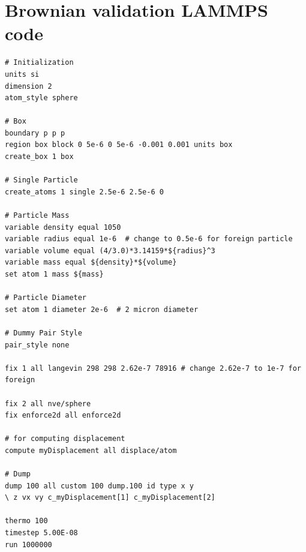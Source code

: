 \section{Brownian validation LAMMPS code}
{\small
\begin{verbatim}
# Initialization
units si
dimension 2
atom_style sphere

# Box
boundary p p p
region box block 0 5e-6 0 5e-6 -0.001 0.001 units box
create_box 1 box

# Single Particle
create_atoms 1 single 2.5e-6 2.5e-6 0

# Particle Mass
variable density equal 1050
variable radius equal 1e-6  # change to 0.5e-6 for foreign particle
variable volume equal (4/3.0)*3.14159*${radius}^3
variable mass equal ${density}*${volume}
set atom 1 mass ${mass}

# Particle Diameter
set atom 1 diameter 2e-6  # 2 micron diameter

# Dummy Pair Style
pair_style none

fix 1 all langevin 298 298 2.62e-7 78916 # change 2.62e-7 to 1e-7 for foreign

fix 2 all nve/sphere
fix enforce2d all enforce2d

# for computing displacement
compute myDisplacement all displace/atom

# Dump
dump 100 all custom 100 dump.100 id type x y 
\ z vx vy c_myDisplacement[1] c_myDisplacement[2]

thermo 100
timestep 5.00E-08
run 1000000
\end{verbatim}
}

